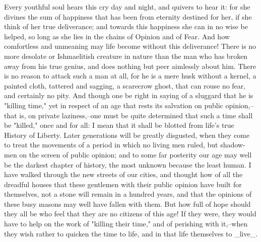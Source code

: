 Every youthful soul hears this cry day and night, and quivers to hear
it: for she divines the sum of happiness that has been from eternity
destined for her, if she think of her true deliverance; and towards
this happiness she can in no wise be helped, so long as she lies in
the chains of Opinion and of Fear. And how comfortless and unmeaning
may life become without this deliverance! There is no more desolate
or Ishmaelitish creature in nature than the man who has broken away
from his true genius, and does nothing but peer aimlessly about him.
There is no reason to attack such a man at all, for he is a mere husk
without a kernel, a painted cloth, tattered and sagging, a scarecrow
ghost, that can rouse no fear, and certainly no pity. And though one
be right in saying of a sluggard that he is "killing time," yet in
respect of an age that rests its salvation on public opinion,--that
is, on private laziness,--one must be quite determined that such a
time shall be "killed," once and for all: I mean that it shall be
blotted from life's true History of Liberty. Later generations will
be greatly disgusted, when they come to treat the movements of a
period in which no living men ruled, but shadow-men on the screen of
public opinion; and to some far posterity our age may well be the
darkest chapter of history, the most unknown because the least human.
I have walked through the new streets of our cities, and thought how
of all the dreadful houses that these gentlemen with their public
opinion have built for themselves, not a stone will remain in a
hundred years, and that the opinions of these busy masons may well
have fallen with them. But how full of hope should they all be who
feel that they are no citizens of this age! If they were, they would
have to help on the work of "killing their time," and of perishing
with it,--when they wish rather to quicken the time to life, and in
that life themselves to _live_.

